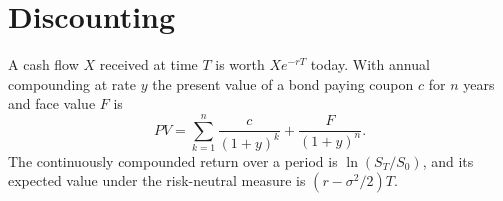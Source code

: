 \documentclass[11pt]{article}
\begin{document}
\newpage
\section{Discounting}

A cash flow $X$ received at time $T$ is worth $X e^{-rT}$ today. With annual compounding at rate $y$
the present value of a bond paying coupon $c$ for $n$ years and face value $F$ is
\begin{equation}
  PV = \sum_{k=1}^{n} \frac{c}{(1+y)^k} + \frac{F}{(1+y)^n}.
\end{equation}
The continuously compounded return over a period is $\ln(S_T/S_0)$, and its expected value
under the risk-neutral measure is $(r - \sigma^2/2)T$.
\end{document}
